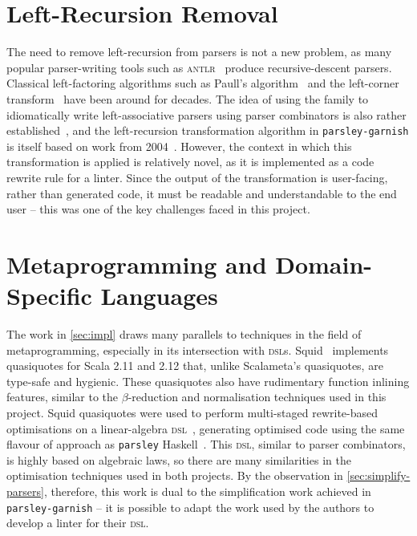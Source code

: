 \documentclass[../../main.tex]{subfiles}
\begin{document}
\section{Left-Recursion Removal}
The need to remove left-recursion from parsers is not a new problem, as many popular parser-writing tools such as \textsc{antlr}~\cite{parr_antlr_2013} produce recursive-descent parsers.
Classical left-factoring algorithms such as Paull's algorithm~\cite{moore_removing_2000} and the left-corner transform~\cite{rosenkrantz_deterministic_1970} have been around for decades.
The idea of using the  family to idiomatically write left-associative parsers using parser combinators is also rather established~\cite{fokker_functional_1995}, and the left-recursion transformation algorithm in \texttt{parsley-garnish} is itself based on work from 2004~\cite{baars_leftrec_2004}.
However, the context in which this transformation is applied is relatively novel, as it is implemented as a code rewrite rule for a linter.
Since the output of the transformation is user-facing, rather than generated code, it must be readable and understandable to the end user -- this was one of the key challenges faced in this project.

\section{Metaprogramming and Domain-Specific Languages}
The work in \cref{sec:impl} draws many parallels to techniques in the field of metaprogramming, especially in its intersection with \textsc{dsl}s.
Squid~\cite{parreaux_squid_2017,parreaux_quoted_2017,parreaux_unifying_2017} implements quasiquotes for Scala 2.11 and 2.12 that, unlike Scalameta's quasiquotes, are type-safe and hygienic.
These quasiquotes also have rudimentary function inlining features, similar to the $\beta$-reduction and normalisation techniques used in this project.
Squid quasiquotes were used to perform multi-staged rewrite-based optimisations on a linear-algebra \textsc{dsl}~\cite{shaikhna_finally_2019}, generating optimised code using the same flavour of approach as \texttt{parsley} Haskell~\cite{willis_staged_2023,willis_parsley_2024}.
This \textsc{dsl}, similar to parser combinators, is highly based on algebraic laws, so there are many similarities in the optimisation techniques used in both projects.
By the observation in \cref{sec:simplify-parsers}, therefore, this work is dual to the simplification work achieved in \texttt{parsley-garnish} -- it is possible to adapt the work used by the authors to develop a linter for their \textsc{dsl}.
\end{document}
